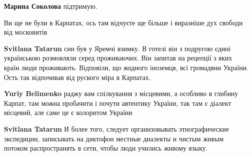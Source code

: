 \begin{itemize}
\begin{itemize}
 
\textbf{Марина Соколова} підтримую.
\end{itemize}

 
Ви ще не були в Карпатах, ось там відчуєте ще більше і виразніше дух свободи
від московитів

\begin{itemize}
 
\textbf{Svitlana Tatarun} син був у Яремчі взимку. В готелі він з подругою єдині українською розмовляли серед проживаючих. Він запитав на рецепції з яких країн люди проживають. Відповіли, що жодного іноземця, всі громадяни України. Ость так відпочивав від руского міра в Карпатах.

 
\textbf{Yuriy Belimenko} раджу вам спілкування з місцевими, а особливо в глибину Карпат, там можна пробачити і почути автентику України, так там є діалект місцевий, але саме це є колоритом України

 
\textbf{Svitlana Tatarun} И более того, следует организовывать этнографические экспедиции, записывать на диктофон местные диалекты и чистым живым потоком распространять в сети, чтобы люди учились живому языку.


\end{itemize}
\end{itemize}
